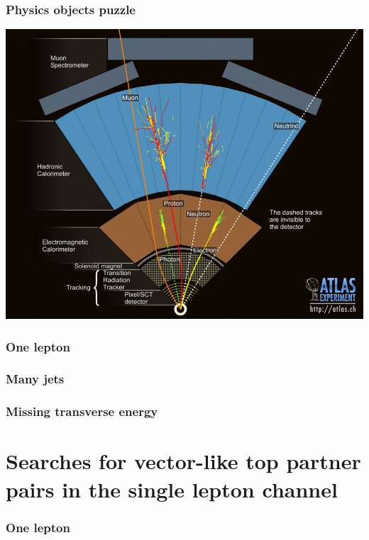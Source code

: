 \documentclass[xcolor=dvipsnames,10pt]{beamer}
\begin{document}
\begin{frame}\frametitle{Physics objects puzzle}
\centering\myskip

\includegraphics[height=0.85\textheight, width=1.\textwidth]{../detector/figures/detection}

\end{frame}



\begin{frame}\frametitle{One lepton}
\centering\myskip

\end{frame}



\begin{frame}\frametitle{Many jets}
\centering\myskip

\end{frame}



\begin{frame}\frametitle{Missing transverse energy}
\centering\myskip

\end{frame}



\section{Searches for vector-like top partner pairs in the single lepton channel}

\begin{frame}\frametitle{One lepton}
\centering\myskip

\end{frame}
\end{document}
